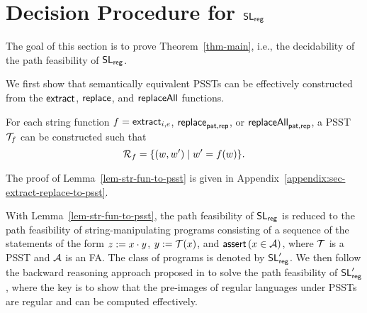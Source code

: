
\section{Decision Procedure for $\mathsf{SL}_{\sf reg}$} \label{sec:decision}

The goal of this section is to prove Theorem~\ref{thm-main}, i.e., the decidability of the path feasibility of $\mathsf{SL}_{\sf reg}$. 
%


We first show that semantically equivalent PSSTs can be effectively constructed from the $\mathsf{extract}$, $\mathsf{replace}$, and $\mathsf{replaceAll}$ functions. 

\begin{lemma}\label{lem-str-fun-to-psst}
For each string function $f = \mathsf{extract}_{i,e}$, $\mathsf{replace}_{\mathsf{pat}, \mathsf{rep}}$, or $\mathsf{replaceAll}_{\mathsf{pat}, \mathsf{rep}}$, a PSST $\mathcal{T}_f$ can be constructed such that 
$$\mathcal{R}_{f} = \{(w, w') \mid w'= f(w)\}.$$
\end{lemma}

%
The proof of Lemma~\ref{lem-str-fun-to-psst} is given in Appendix~\ref{appendix:sec-extract-replace-to-psst}.

With Lemma~\ref{lem-str-fun-to-psst}, the path feasibility of $\mathsf{SL}_{\sf reg}$ is reduced to the path feasibility of string-manipulating programs consisting of  a sequence of the statements of the form $z:=x \cdot y$, $y:=\mathcal{T}(x)$, and $\textsf{assert}\left(x \in \mathcal{A}\right)$, where $\mathcal{T}$ is a PSST and $\mathcal{A}$ is an FA.  The class of programs is denoted by $\mathsf{SL}'_{\sf reg}$. We then  follow %
the backward reasoning approach proposed in \cite{CCH+18,CHL+19} to solve the path feasibility of $\mathsf{SL}'_{\sf reg}$, where the key is to show that the pre-images of regular languages  under PSSTs  are regular and can be computed effectively.

